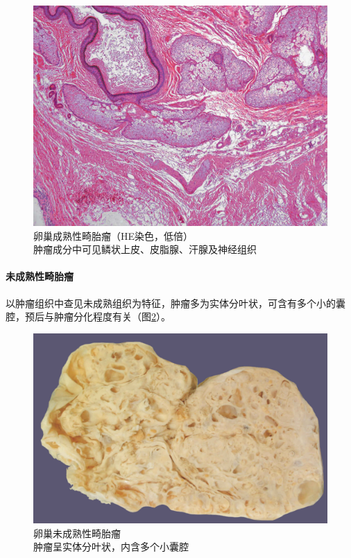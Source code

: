 \begin{figure}[!htbp]
 \centering
 \includegraphics{./images/Image00200.jpg}
 \captionsetup{justification=centering}
 \caption{卵巢成熟性畸胎瘤（HE染色，低倍）\\ {\small 肿瘤成分中可见鳞状上皮、皮脂腺、汗腺及神经组织}}
\label{fig11-13}
  \end{figure}

\paragraph{未成熟性畸胎瘤}
以肿瘤组织中查见未成熟组织为特征，肿瘤多为实体分叶状，可含有多个小的囊腔，预后与肿瘤分化程度有关（图\ref{fig11-14}）。

\begin{figure}[!htbp]
 \centering
 \includegraphics{./images/Image00201.jpg}
 \captionsetup{justification=centering}
 \caption{卵巢未成熟性畸胎瘤\\ {\small 肿瘤呈实体分叶状，内含多个小囊腔}}
\label{fig11-14}
  \end{figure}

